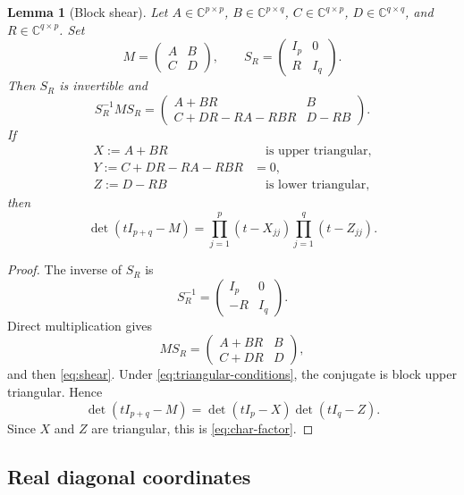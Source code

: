 \documentclass[11pt]{amsart}
\newtheorem{lemma}[theorem]{Lemma}
\theoremstyle{definition}
\theoremstyle{remark}
\newcommand{\C}{\mathbb C}
\numberwithin{equation}{section}
\begin{document}
\begin{lemma}[Block shear]\label{lem:shear}
Let $A\in\C^{p\times p}$, $B\in\C^{p\times q}$, $C\in\C^{q\times p}$, $D\in\C^{q\times q}$, and $R\in\C^{q\times p}$. Set
\[
 M=\begin{pmatrix}A&B\\ C&D\end{pmatrix},\qquad
 S_R=\begin{pmatrix}I_p&0\\ R&I_q\end{pmatrix}.
\]
Then $S_R$ is invertible and
\begin{equation}\label{eq:shear}
 S_R^{-1}MS_R=
 \begin{pmatrix}
 A+BR&B\\
 C+DR-RA-RBR&D-RB
 \end{pmatrix}.
\end{equation}
If
\begin{equation}\label{eq:triangular-conditions}
 \begin{aligned}
 X:=A+BR&\quad\text{is upper triangular},\\
 Y:=C+DR-RA-RBR&=0,\\
 Z:=D-RB&\quad\text{is lower triangular},
 \end{aligned}
\end{equation}
then
\begin{equation}\label{eq:char-factor}
 \det(tI_{p+q}-M)
 =\prod_{j=1}^p(t-X_{jj})\prod_{j=1}^q(t-Z_{jj}).
\end{equation}
\end{lemma}

\begin{proof}
The inverse of $S_R$ is
\[
 S_R^{-1}=\begin{pmatrix}I_p&0\\-R&I_q\end{pmatrix}.
\]
Direct multiplication gives
\[
 MS_R=\begin{pmatrix}A+BR&B\\ C+DR&D\end{pmatrix},
\]
and then \eqref{eq:shear}. Under \eqref{eq:triangular-conditions}, the conjugate is block upper triangular. Hence
\[
 \det(tI_{p+q}-M)=\det(tI_p-X)\det(tI_q-Z).
\]
Since $X$ and $Z$ are triangular, this is \eqref{eq:char-factor}.
\end{proof}

\subsection{Real diagonal coordinates}
\end{document}
